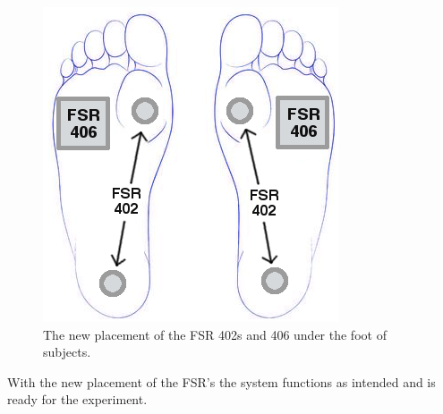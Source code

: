 \begin{figure}[H]
	\includegraphics[width=.6\textwidth]{figures/humanSoleSensorPlacement}
	\caption{The new placement of the FSR 402s and 406 under the foot of subjects.}
	\label{fig:soleSensorPlacement}  %
\end{figure}

With the new placement of the FSR’s the system functions as intended and is ready for the experiment. 
